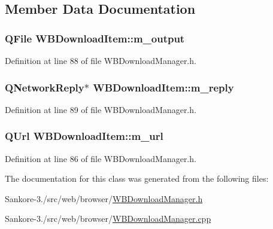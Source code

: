 \subsection{Member Data Documentation}
\hypertarget{class_w_b_download_item_a1694a95d565679f7d12285b697ccf839}{
\subsubsection[{m\-\_\-output}]{\setlength{\rightskip}{0pt plus 5cm}Q\-File W\-B\-Download\-Item\-::m\-\_\-output}}\label{d1/d7a/class_w_b_download_item_a1694a95d565679f7d12285b697ccf839}


Definition at line 88 of file W\-B\-Download\-Manager.\-h.

\hypertarget{class_w_b_download_item_a2c41d2e38b2be81d4cb4d6565a339fda}{
\subsubsection[{m\-\_\-reply}]{\setlength{\rightskip}{0pt plus 5cm}Q\-Network\-Reply$\ast$ W\-B\-Download\-Item\-::m\-\_\-reply}}\label{d1/d7a/class_w_b_download_item_a2c41d2e38b2be81d4cb4d6565a339fda}


Definition at line 89 of file W\-B\-Download\-Manager.\-h.

\hypertarget{class_w_b_download_item_ac9f3934c2505e3ceb68fb330a8702493}{
\subsubsection[{m\-\_\-url}]{\setlength{\rightskip}{0pt plus 5cm}Q\-Url W\-B\-Download\-Item\-::m\-\_\-url}}\label{d1/d7a/class_w_b_download_item_ac9f3934c2505e3ceb68fb330a8702493}


Definition at line 86 of file W\-B\-Download\-Manager.\-h.



The documentation for this class was generated from the following files\-:\begin{DoxyCompactItemize}
\item 
Sankore-\/3./src/web/browser/\hyperlink{_w_b_download_manager_8h}{W\-B\-Download\-Manager.\-h}\item 
Sankore-\/3./src/web/browser/\hyperlink{_w_b_download_manager_8cpp}{W\-B\-Download\-Manager.\-cpp}\end{DoxyCompactItemize}
